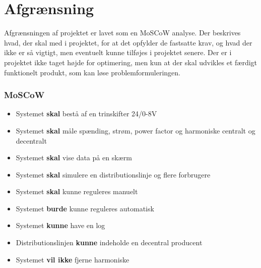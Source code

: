 

\section{Afgrænsning}
Afgrænsningen af projektet er lavet som en MoSCoW analyse. Der beskrives hvad, der skal med i projektet, for at det opfylder de fastsatte krav, og hvad der ikke er så vigtigt, men eventuelt kunne tilføjes i projektet senere. Der er i projektet ikke taget højde for optimering, men kun at der skal udvikles et færdigt funktionelt produkt, som kan løse problemformuleringen.
\subsubsection{MoSCoW}

\begin{itemize}
	\item{Systemet \textbf{skal} bestå af en trinskifter 24/0-8V}
	\item{Systemet \textbf{skal} måle spænding, strøm, power factor og harmoniske centralt og decentralt}
	\item{Systemet \textbf{skal} vise data på en skærm}
	\item{Systemet \textbf{skal} simulere en distributionslinje og flere forbrugere}
	\item{Systemet \textbf{skal} kunne reguleres manuelt}
	\item{Systemet \textbf{burde} kunne reguleres automatisk}
	\item{Systemet \textbf{kunne} have en log}
	\item{Distributionslinjen \textbf{kunne} indeholde en decentral producent}
	\item{Systemet \textbf{vil ikke} fjerne harmoniske} 
\end{itemize}	